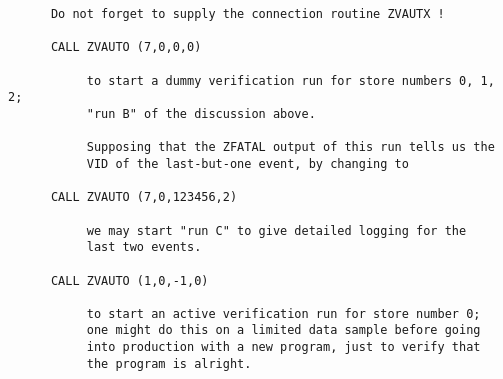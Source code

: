 \begin{verbatim}
      Do not forget to supply the connection routine ZVAUTX !

      CALL ZVAUTO (7,0,0,0)

           to start a dummy verification run for store numbers 0, 1, 2;
           "run B" of the discussion above.

           Supposing that the ZFATAL output of this run tells us the
           VID of the last-but-one event, by changing to
 
      CALL ZVAUTO (7,0,123456,2)

           we may start "run C" to give detailed logging for the
           last two events.

      CALL ZVAUTO (1,0,-1,0)

           to start an active verification run for store number 0;
           one might do this on a limited data sample before going
           into production with a new program, just to verify that
           the program is alright.
\end{verbatim} 


